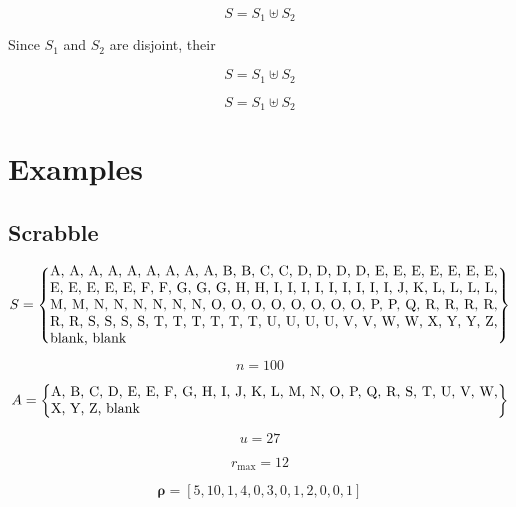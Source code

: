 \documentclass{article}
\begin{document}
\begin{equation}
    S = S_1 \uplus S_2
\end{equation}

Since $S_1$ and $S_2$ are disjoint, their 

\begin{equation}
    S = S_1 \uplus S_2
\end{equation}

\begin{equation}
    S = S_1 \uplus S_2
\end{equation}



\section{Examples}

\subsection{Scrabble}

\begin{equation}\nonumber
    S = \left \{
    \parbox{32em}{A, A, A, A, A, A, A, A, A, B, B, C, C, D, D, D, D, E, E, E, E, E, E, E, E, E, E, E, E, F, F, G, G, G, H, H, I, I, I, I, I, I, I, I, I, J, K, L, L, L, L, M, M, N, N, N, N, N, N, O, O, O, O, O, O, O, O, P, P, Q, R, R, R, R, R, R, S, S, S, S, T, T, T, T, T, T, U, U, U, U, V, V, W, W, X, Y, Y, Z, blank, blank}\right \}
\end{equation}

\begin{equation}\nonumber
    n = 100
\end{equation}

\begin{equation}\nonumber
    A = \left \{
    \parbox{32em}{A, B, C, D, E, E, F, G, H, I, J, K, L, M, N, O, P, Q, R, S, T, U, V, W, X, Y, Z, blank}\right \}
\end{equation}

\begin{equation}\nonumber
    u = 27
\end{equation}

\begin{equation}\nonumber
    r_{\max} = 12
\end{equation}

\begin{equation}\nonumber
    \bm{\rho} = [5, 10, 1, 4, 0, 3, 0, 1, 2, 0, 0, 1]
\end{equation}
\end{document}
